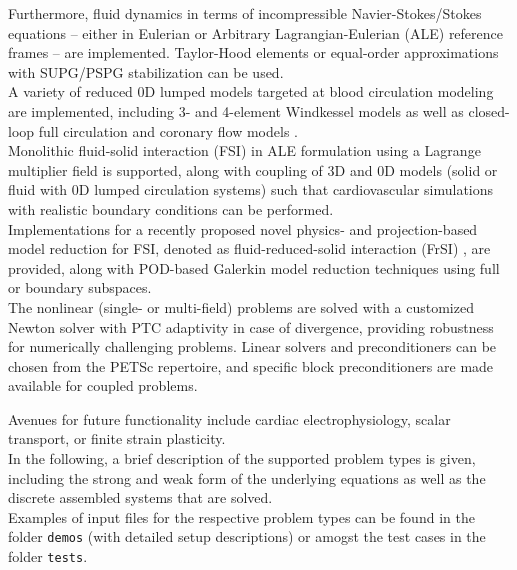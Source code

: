 \documentclass[a4paper,12pt]{report}
\begin{document}
Furthermore, fluid dynamics in terms of incompressible Navier-Stokes/Stokes equations -- either in Eulerian or Arbitrary Lagrangian-Eulerian (ALE) reference frames -- are implemented. Taylor-Hood elements or equal-order approximations with SUPG/PSPG stabilization \cite{tezduyar2000} can be used.\\

A variety of reduced 0D lumped models targeted at blood circulation modeling are implemented, including 3- and 4-element Windkessel models \cite{westerhof2009} as well as closed-loop full circulation \cite{hirschvogel2017} and coronary flow models \cite{arthurs2016}.\\

Monolithic fluid-solid interaction (FSI) \cite{nordsletten2011} in ALE formulation using a Lagrange multiplier field is supported, along with coupling of 3D and 0D models (solid or fluid with 0D lumped circulation systems) such that cardiovascular simulations with realistic boundary conditions can be performed.\\

Implementations for a recently proposed novel physics- and projection-based model reduction for FSI, denoted as fluid-reduced-solid interaction (FrSI) \cite{hirschvogel2024-frsi}, are provided, along with POD-based Galerkin model reduction techniques \cite{farhat2014} using full or boundary subspaces.\\

The nonlinear (single- or multi-field) problems are solved with a customized Newton solver with PTC \cite{gee2009} adaptivity in case of divergence, providing robustness for numerically challenging problems. Linear solvers and preconditioners can be chosen from the PETSc repertoire, and specific block preconditioners are made available for coupled problems.

Avenues for future functionality include cardiac electrophysiology, scalar transport, or finite strain plasticity.\\

In the following, a brief description of the supported problem types is given, including the strong and weak form of the underlying equations as well as the discrete assembled systems that are solved.\\

Examples of input files for the respective problem types can be found in the folder \verb"demos" (with detailed setup descriptions) or amogst the test cases in the folder \verb"tests".\\
\end{document}
